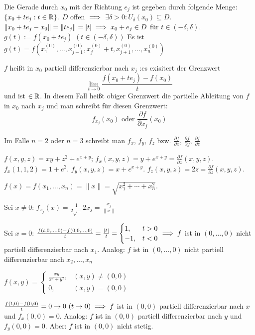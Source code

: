 \documentclass[a4paper,twoside,DIV15,BCOR12mm,chapterprefix=true,headings=twolinechapter]{scrbook}
\begin{document}
Die Gerade durch $x_0$ mit der Richtung $e_j$ ist gegeben durch folgende Menge: $\{x_0+te_j:t\in\mathbb{R}\}$. $D$ offen $\implies$ $\exists\delta>0: U_\delta(x_0)\subseteq D$. $\|x_0+te_j - x_0\| = \|te_j\| = |t| \implies x_0+e_j \in D $ für $t\in(-\delta,\delta)$. $g(t) := f(x_0+te_j)$ $(t\in(-\delta,\delta))$
 Es ist $g(t) = f(x_1^{(0)}, \ldots, x_{j-1}^{(0)}, x_j^{(0)} + t, x_{j+1}^{(0)}, \ldots, x_n^{(0)} )$

\begin{definition}
$f$ heißt in $x_0$ partiell differenzierbar nach $x_j$ :\equizu es exisitert der Grenzwert $$\lim_{t\to0}\frac{f(x_0+te_j) - f(x_0)}t$$ und ist $\in\mathbb{R}$. In diesem Fall heißt obiger Grenzwert die partielle Ableitung von $f$ in $x_0$ nach $x_j$ und man schreibt für diesen Grenzwert: $$f_{x_j}(x_0) \text{ oder }\frac{\partial f}{\partial x_j}(x_0)$$

Im Falle $n=2$ oder $n=3$ schreibt man $f_x$, $f_y$, $f_z$ bzw. $\frac{\partial f}{\partial x}$, $\frac{\partial f}{\partial y}$, $\frac{\partial f}{\partial z}$
\end{definition}


\begin{beispiele}
\item $f(x,y,z) = xy+z^2+e^{x+y}$; $f_x(x,y,z) = y + e^{x+y} = \frac{\partial f}{\partial x}(x,y,z)$. $f_x(1,1,2)=1+e^2$. $f_y(x,y,z) = x+e^{x+y}$. $f_z(x,y,z) = 2z = \frac{\partial f}{\partial z}(x,y,z)$.
\item $f(x) = f(x_1,\ldots, x_n) = \|x\| = \sqrt{x_1^2 + \cdots + x_n^2}$.

Sei $x\ne0$: $f_{x_j}(x) = \frac{1}{2\sqrt{\ldots}}2x_j = \frac{x_j}{\|x\|} $

Sei $x=0$: $\frac{f(t,0,\ldots,0) - f(0,0,\ldots,0)}{t} = \frac{|t|}{t} = \begin{cases} 1, &t>0\\-1,&t<0\end{cases} \implies f$ ist in $(0,\ldots,0)$ nicht partiell differenzierbar nach $x_1$. Analog: $f$ ist in $(0,\ldots,0)$ nicht partiell differenzierbar nach $x_2,\ldots,x_n$
\item $f(x,y) = \begin{cases} \frac{xy}{x^2+y^2}, &(x,y)\ne(0,0)\\0,&(x,y) = (0,0) \end{cases}$

$\frac{f(t,0) - f(0,0)}{t} = 0 \to 0 \ (t\to0) \folgt f$ ist in $(0,0)$ partiell differenzierbar nach $x$ und $f_x(0,0) = 0$. Analog: $f$ ist in $(0,0)$ partiell differenzierbar nach $y$ und $f_y(0,0) = 0$. Aber: $f$ ist in $(0,0)$ nicht stetig.
\end{beispiele}
\end{document}
